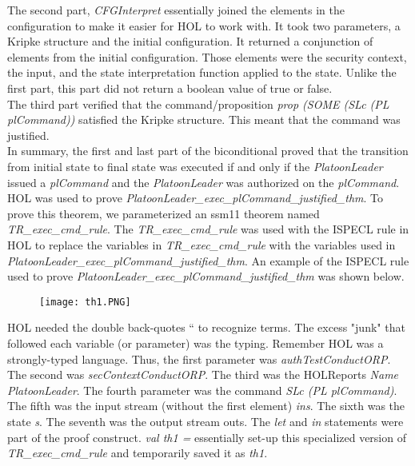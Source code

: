 The second part, \emph{CFGInterpret} essentially joined the elements in the configuration to make it easier for HOL to work with.  It took two parameters, a Kripke structure and the initial configuration.  It returned a conjunction of elements from the initial configuration.  Those elements were the security context, the input, and the state interpretation function applied to the state.  Unlike the first part, this part did not return a boolean value of true or false.\\
  
The third part verified that the command/proposition \emph{prop (SOME (SLc (PL plCommand))} satisfied the Kripke structure.  This meant that the command was justified. \\
 
In summary, the first and last part of the biconditional proved that the transition from initial state to final state was executed if and only if the \emph{PlatoonLeader} issued a \emph{plCommand} and the \emph{PlatoonLeader} was authorized on the \emph{plCommand}.  \\
  
HOL was used to prove \emph{PlatoonLeader_exec_plCommand_justified_thm}.  To prove this theorem, we parameterized an ssm11 theorem named \emph{TR_exec_cmd_rule}.  The \emph{TR_exec_cmd_rule} was used with the ISPECL rule in HOL to replace the variables in \emph{TR_exec_cmd_rule} with the variables used in \emph{PlatoonLeader_exec_plCommand_justified_thm}.  An example of the ISPECL rule used to prove \emph{PlatoonLeader_exec_plCommand_justified_thm} was shown below.\\
  
  \begin{figure}[h]
  \centering
  \texttt{[image: th1.PNG]}
\end{figure}

HOL needed the double back-quotes `` to recognize terms.  The excess "junk" that followed each variable (or parameter) was the typing.  Remember HOL was a strongly-typed language.  Thus, the first parameter was \emph{authTestConductORP}.  The second was \emph{secContextConductORP}. The third was the HOLReports \emph{Name PlatoonLeader}.  The fourth parameter was the command \emph{SLc (PL plCommand)}.  The fifth was the input stream (without the first element) \emph{ins}.  The sixth was the state \emph{s}.  The seventh was the output stream outs.  The \emph{let} and \emph{in} statements were part of the proof construct.  \emph{val th1 =} essentially set-up this specialized version of \emph{TR_exec_cmd_rule} and temporarily saved it as \emph{th1}.   \\

